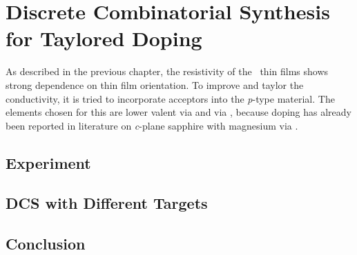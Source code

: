 \section{Discrete Combinatorial Synthesis for Taylored Doping}
    \label{Sec:Results_Doping}
As described in the previous chapter, the resistivity of the \cro\ thin films shows strong dependence on thin film orientation.
To improve and taylor the conductivity, it is tried to incorporate acceptors into the \textit{p}-type material.
The elements chosen for this are lower valent  via  and  via , because doping has already been reported in literature on \textit{c}-plane sapphire with magnesium via 
    \cite{farrell2015}.

\subsection{Experiment}
    
\subsection{DCS with Different Targets}
    
\subsection{Conclusion}
    